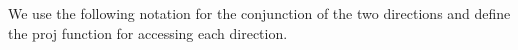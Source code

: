 We use the following notation for the conjunction of the two
directions and define the \textsf{proj} function for accessing each
direction.

\begin{code}%
\>[0]\AgdaSpace{}%
\AgdaSymbol{:}\AgdaSpace{}%
\AgdaSpace{}%
\AgdaSpace{}%
\AgdaSpace{}%
\AgdaSpace{}%
\AgdaSpace{}%
\AgdaSpace{}%
\AgdaSpace{}%
\AgdaSpace{}%
\AgdaSpace{}%
\<%
\\
\>[0]\AgdaSpace{}%
\AgdaSpace{}%
\AgdaSpace{}%
\AgdaSpace{}%
\AgdaSpace{}%
\AgdaSpace{}%
\AgdaSpace{}%
\AgdaSymbol{=}\AgdaSpace{}%
\AgdaSymbol{(}\AgdaSpace{}%
\AgdaSpace{}%
\AgdaSpace{}%
\AgdaSpace{}%
\AgdaSpace{}%
\AgdaSpace{}%
\AgdaSpace{}%
\AgdaSpace{}%
\AgdaSymbol{)}\AgdaSpace{}%
\AgdaSpace{}%
\AgdaSymbol{(}\AgdaSpace{}%
\AgdaSpace{}%
\AgdaSpace{}%
\AgdaSpace{}%
\AgdaSpace{}%
\AgdaSpace{}%
\AgdaSpace{}%
\AgdaSpace{}%
\AgdaSymbol{)}\<%
\\
%
\\[\AgdaEmptyExtraSkip]%
\>[0]\AgdaSpace{}%
\AgdaSymbol{:}\AgdaSpace{}%
\AgdaSpace{}%
\AgdaSymbol{\{}\AgdaSymbol{\}\{}\AgdaSymbol{\}}\AgdaSpace{}%
\AgdaSpace{}%
\AgdaSymbol{(}\AgdaSpace{}%
\AgdaSymbol{:}\AgdaSpace{}%
\AgdaSymbol{)}\AgdaSpace{}%
\AgdaSpace{}%
\AgdaSymbol{(}\AgdaSpace{}%
\AgdaSpace{}%
\AgdaSymbol{:}\AgdaSpace{}%
\AgdaSymbol{)}\AgdaSpace{}%
\AgdaSpace{}%
\AgdaSpace{}%
\AgdaSpace{}%
\AgdaSpace{}%
\AgdaSpace{}%
\AgdaSpace{}%
\AgdaSpace{}%

\end{code}
